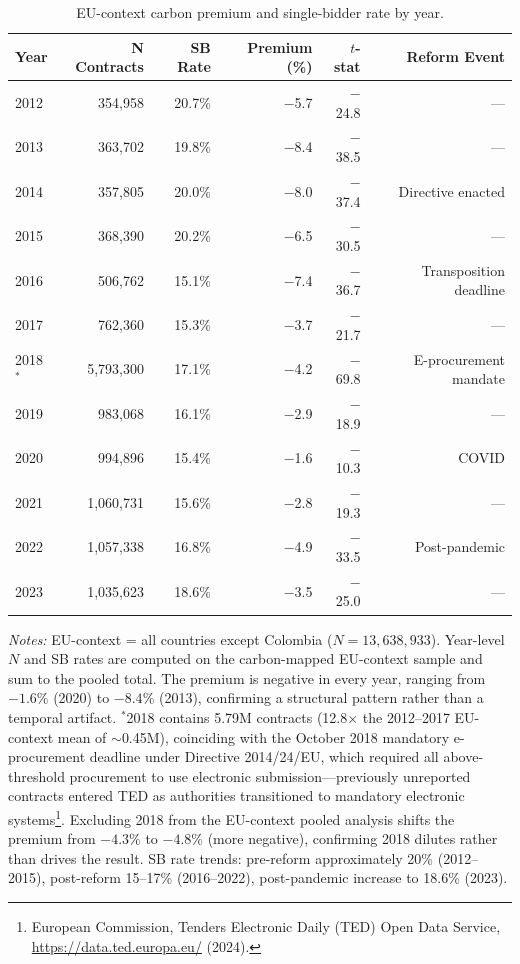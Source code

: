 \documentclass[11pt]{article}
\newcommand{\tabnoteblock}[1]{%
    \par\vspace{0.45em}%
    \begin{minipage}{0.98\linewidth}
    \footnotesize\raggedright #1
    \end{minipage}\par
}
\newcommand{\tabnotes}[1]{\tabnoteblock{\textit{Notes:} #1}}
\begin{document}
\begin{table}[H]
\centering
\caption{EU-context carbon premium and single-bidder rate by year.}
\label{tab:temporal_eu}
\begin{tabular}{lrrrrr}
\toprule
\textbf{Year} & \textbf{N Contracts} & \textbf{SB Rate} & \textbf{Premium (\%)} & \textbf{$t$-stat} & \textbf{Reform Event} \\
\midrule
2012 & 354,958 & 20.7\% & $-$5.7 & $-$24.8 & --- \\
2013 & 363,702 & 19.8\% & $-$8.4 & $-$38.5 & --- \\
2014 & 357,805 & 20.0\% & $-$8.0 & $-$37.4 & Directive enacted \\
2015 & 368,390 & 20.2\% & $-$6.5 & $-$30.5 & --- \\
2016 & 506,762 & 15.1\% & $-$7.4 & $-$36.7 & Transposition deadline \\
2017 & 762,360 & 15.3\% & $-$3.7 & $-$21.7 & --- \\
2018$^*$ & 5,793,300 & 17.1\% & $-$4.2 & $-$69.8 & E-procurement mandate \\
2019 & 983,068 & 16.1\% & $-$2.9 & $-$18.9 & --- \\
2020 & 994,896 & 15.4\% & $-$1.6 & $-$10.3 & COVID \\
2021 & 1,060,731 & 15.6\% & $-$2.8 & $-$19.3 & --- \\
2022 & 1,057,338 & 16.8\% & $-$4.9 & $-$33.5 & Post-pandemic \\
2023 & 1,035,623 & 18.6\% & $-$3.5 & $-$25.0 & --- \\
\bottomrule
\end{tabular}

\tabnotes{EU-context = all countries except Colombia ($N = 13{,}638{,}933$). Year-level $N$ and SB rates are computed on the carbon-mapped EU-context sample and sum to the pooled total. The premium is negative in every year, ranging from $-1.6\%$ (2020) to $-8.4\%$ (2013), confirming a structural pattern rather than a temporal artifact. $^*$2018 contains 5.79M contracts (12.8$\times$ the 2012--2017 EU-context mean of ${\sim}$0.45M), coinciding with the October 2018 mandatory e-procurement deadline under Directive 2014/24/EU, which required all above-threshold procurement to use electronic submission---previously unreported contracts entered TED as authorities transitioned to mandatory electronic systems\footnote{European Commission, Tenders Electronic Daily (TED) Open Data Service, \url{https://data.ted.europa.eu/} (2024).}. Excluding 2018 from the EU-context pooled analysis shifts the premium from $-4.3\%$ to $-4.8\%$ (more negative), confirming 2018 dilutes rather than drives the result. SB rate trends: pre-reform approximately 20\% (2012--2015), post-reform 15--17\% (2016--2022), post-pandemic increase to 18.6\% (2023).
}
\end{table}
\end{document}

